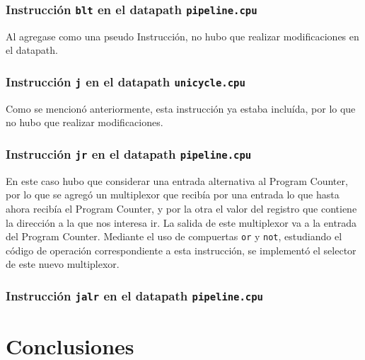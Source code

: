 \documentclass[a4paper,10pt]{article}
\begin{document}
\subsubsection{Instrucción \texttt{blt} en el datapath \texttt{pipeline.cpu}}
Al agregase como una pseudo Instrucci\'on, no hubo que realizar modificaciones en el datapath. 

\subsubsection{Instrucción \texttt{j} en el datapath \texttt{unicycle.cpu}}
Como se mencionó anteriormente, esta instrucción ya estaba incluída, por lo que no hubo que realizar modificaciones. 

\subsubsection{Instrucción \texttt{jr} en el datapath \texttt{pipeline.cpu}}
En este caso hubo que considerar una entrada alternativa al Program Counter, por lo que se agregó un multiplexor que recibía por una entrada lo que hasta ahora recibía el Program Counter, y por la otra el valor del registro que contiene la direcci\'on a la que nos interesa ir. La salida de este multiplexor va a la entrada del Program Counter. Mediante el uso de compuertas \texttt{or} y \texttt{not}, estudiando el c\'odigo de operaci\'on correspondiente a esta instrucci\'on, se implement\'o el selector de este nuevo multiplexor. 

\subsubsection{Instrucción \texttt{jalr} en el datapath \texttt{pipeline.cpu}}

\newpage

\section{Conclusiones}


\end{document}
